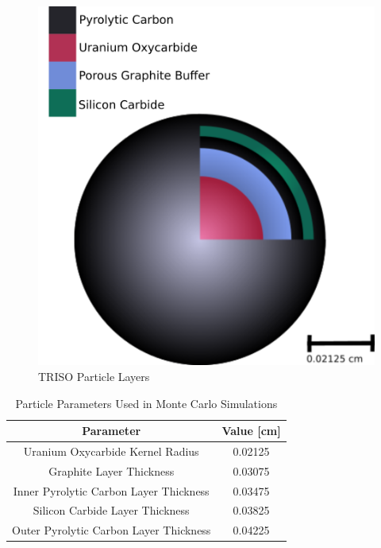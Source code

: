
\begin{figure}[H]
\centering

\includegraphics[width=0.5\linewidth]{figures/trisos-r-like-onions.png}
\caption{TRISO Particle Layers}
\label{fig:particle-layer}
\end{figure}

\begin{table}[h!]
\centering

\caption{Particle Parameters Used in Monte Carlo Simulations}
\begin{tabular}{ c  c }
\hline
Parameter & Value [cm] \\
\hline 
Uranium Oxycarbide Kernel Radius & 0.02125 \\
Graphite Layer Thickness & 0.03075 \\
Inner Pyrolytic Carbon Layer Thickness & 0.03475 \\
Silicon Carbide Layer Thickness & 0.03825 \\
Outer Pyrolytic Carbon Layer Thickness & 0.04225 \\
\hline
\end{tabular}
\label{table:particle-params}

\end{table}
